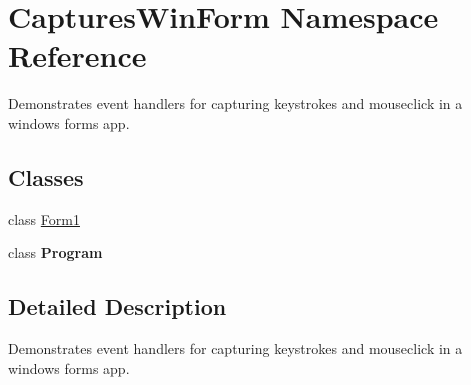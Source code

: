 \hypertarget{namespace_captures_win_form}{}\section{Captures\+Win\+Form Namespace Reference}
\label{namespace_captures_win_form}


Demonstrates event handlers for capturing keystrokes and mouseclick in a windows forms app.  


\subsection*{Classes}
\begin{DoxyCompactItemize}
\item 
class \hyperlink{class_captures_win_form_1_1_form1}{Form1}
\item 
class {\bfseries Program}
\end{DoxyCompactItemize}


\subsection{Detailed Description}
Demonstrates event handlers for capturing keystrokes and mouseclick in a windows forms app. 

